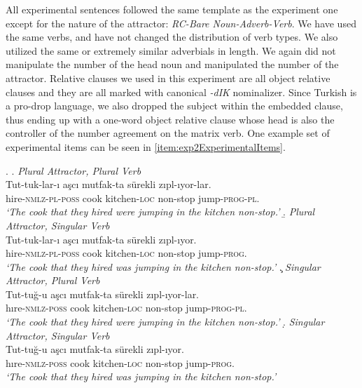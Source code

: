 \documentclass[doc,a4paper,man,natbib,floatsintext,noextraspace]{apa6}\usepackage[]{graphicx}\usepackage[]{color}
\begin{document}
All experimental sentences followed the same template as the experiment one except for the nature of the attractor: \textit{RC-Bare Noun-Adverb-Verb}. 
We have used the same verbs, and have not changed the distribution of verb types. We also utilized the same or extremely similar adverbials in length. We again did not manipulate the number of the head noun and manipulated the number of the attractor. Relative clauses we used in this experiment are all object relative clauses and they are all marked with canonical \textit{-dIK} nominalizer. Since Turkish is a pro-drop language, we also dropped the subject within the embedded clause, thus ending up with a one-word object relative clause whose head is also the controller of the number agreement on the matrix verb. One example set of experimental items can be seen in \ref{item:exp2ExperimentalItems}.


\ex. \label{item:exp2ExperimentalItems}
%
\a. \textit{Plural Attractor, Plural Verb}\label{item:exp2expitem-plpl}\\ 
  \gll *Tut-tuk-lar-ı aşcı mutfak-ta sürekli zıpl-ıyor-lar.\\ 
  hire-\textsc{nmlz}-\textsc{pl}-\textsc{poss}  cook kitchen-\textsc{loc} non-stop  jump-\textsc{prog}-\textsc{pl}.\\
  \glt \textit{`The cook that they hired were jumping in the kitchen non-stop.'}
%
\b. \textit{Plural Attractor, Singular Verb}\label{item:exp2expitem-plsg}\\ 
  \gll Tut-tuk-lar-ı aşcı mutfak-ta sürekli zıpl-ıyor.\\ 
  hire-\textsc{nmlz}-\textsc{pl}-\textsc{poss}  cook kitchen-\textsc{loc} non-stop  jump-\textsc{prog}.\\
  \glt \textit{`The cook that they hired was jumping in the kitchen non-stop.'}
%
\c. \textit{Singular Attractor, Plural Verb}\label{item:exp2expitem-sgpl}\\
  \gll *Tut-tuğ-u aşcı mutfak-ta sürekli zıpl-ıyor-lar.\\ 
  hıre-\textsc{nmlz}-\textsc{poss}  cook kitchen-\textsc{loc} non-stop  jump-\textsc{prog}-\textsc{pl}.\\
  \glt \textit{`The cook that they hired were jumping in the kitchen non-stop.'}
%
\d. \textit{Singular Attractor, Singular Verb}\label{item:exp2expitem-sgsg}\\ 
  \gll Tut-tuğ-u aşcı mutfak-ta sürekli zıpl-ıyor.\\ 
  hıre-\textsc{nmlz}-\textsc{poss}  cook kitchen-\textsc{loc} non-stop  jump-\textsc{prog}.\\
  \glt \textit{`The cook that they hired was jumping in the kitchen non-stop.'}
\end{document}
